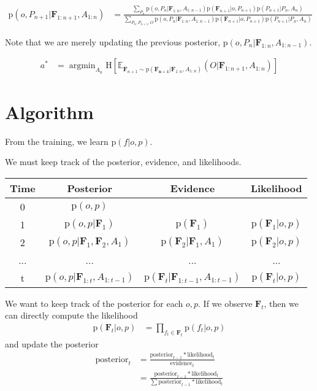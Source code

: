 \documentclass[11pt]{article}
\newcommand{\ProbOpr}[1]{\mathbb{#1}} %
\newcommand{\SetOf}[1]{\mathbf{#1}} %
\newcommand{\prob}[1]{\text{p}(#1)} %
\newcommand{\entropy}[1]{\text{H}\left[#1\right]} %
\newcommand{\expectedValue}[2]{\ProbOpr{E}_{#2}\left(#1\right)} %
\DeclareMathOperator*{\argmin}{argmin}
\newcommand{\Eq}[1]{\begin{align*}#1\end{align*}} %
\begin{document}
	\Eq{\prob{o,P_{n+1}|\SetOf{F}_{1:n+1},A_{1:n}} &= \frac{ \sum_{P_n} \prob{o,P_n|\SetOf{F}_{1:n},A_{1:n-1}} \prob{\SetOf{F}_{n+1}|o,P_{n+1}} \prob{P_{n+1}|P_n,A_n}}{\sum_{P_n,P_{n+1},O} \prob{o,P_n|\SetOf{F}_{1:n},A_{1:n-1}} \prob{\SetOf{F}_{n+1}|o,P_{n+1}} \prob{P_{n+1}|P_n,A_n}} }

	Note that we are merely updating the previous posterior, $\prob{o,P_n|\SetOf{F}_{1:n},A_{1:n-1}}$. 

	\Eq{a^* &= \argmin_{A_n} \entropy{\expectedValue{O|\SetOf{F}_{1:n+1},A_{1:n}}{\SetOf{F}_{n+1} \sim \prob{\SetOf{F_{n+1}}|\SetOf{F}_{1:n},A_{1:n}}}}}

\section{Algorithm}

	From the training, we learn $\prob{f|o,p}$.  
	
	We must keep track of the posterior, evidence, and likelihoods.

	\begin{center}
		\begin{tabular}{c|c|c|c} %
			\hline %
			Time & Posterior & Evidence & Likelihood\\
			[0.5ex] %
			\hline\hline %
			0 & $\prob{o,p}$ & & \\[0.5ex] 
			1 & $\prob{o,p|\SetOf{F}_1}$ & $\prob{\SetOf{F}_1}$ & $\prob{\SetOf{F}_1|o,p}$ \\[0.5ex] 
			2 & $\prob{o,p|\SetOf{F}_1,\SetOf{F}_2,A_1}$ & $\prob{\SetOf{F}_2|\SetOf{F}_1,A_1}$ & $\prob{\SetOf{F}_2|o,p}$ \\
			...&...&...&...\\[0.5ex] 
			t & $\prob{o,p|\SetOf{F}_{1:t},A_{1:t-1}}$ & $\prob{\SetOf{F}_t|\SetOf{F}_{1:t-1},A_{1:t-1}}$ & $\prob{\SetOf{F}_t|o,p}$
		\end{tabular}
		\label{tab:reference}
	\end{center}

	We want to keep track of the posterior for each $o,p$. If we observe $\SetOf{F}_t$, then we can directly compute the likelihood 
	\Eq{\prob{\SetOf{F}_t|o,p} &= \prod_{f_t \in \SetOf{F}_t} \prob{f_t|o,p}} 
	and update the posterior
	\Eq{\text{posterior}_t &= \frac{\text{posterior}_{t-1}*\text{likelihood}_t}{\text{evidence}_t}\\
	&= \frac{\text{posterior}_{t-1}*\text{likelihood}_t}{\sum \text{posterior}_{t-1}*\text{likelihood}_t}}
\end{document}

